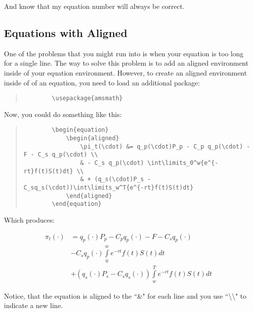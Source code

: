 And know that my equation number will always be correct.

\subsection{Equations with Aligned}
\label{eqwithalign}

One of the problems that you might run into is when your equation is too long for a single line.  The way to solve this problem is to add an aligned environment inside of your equation environment.  However, to create an aligned environment inside of of an equation, you need to load an additional package:

\begin{quote}
	\begin{verbatim}
		\usepackage{amsmath}
	\end{verbatim}
\end{quote}

Now, you could do something like this:

\begin{quote}
	\begin{verbatim}
		\begin{equation}
			\begin{aligned}
	  			\pi_t(\cdot) &= q_p(\cdot)P_p - C_p q_p(\cdot) - F - C_s q_p(\cdot) \\
	  			& - C_s q_p(\cdot) \int\limits_0^w{e^{-rt}f(t)S(t)dt} \\
	  			& + (q_s(\cdot)P_s - C_sq_s(\cdot))\int\limits_w^T{e^{-rt}f(t)S(t)dt}
	 		\end{aligned}
		\end{equation}
	\end{verbatim}
\end{quote}

Which produces:

\begin{equation}
	\begin{aligned}
		\pi_t(\cdot) &= q_p(\cdot)P_p - C_p q_p(\cdot) - F - C_s q_p(\cdot) \\
	  	& - C_s q_p(\cdot) \int\limits_0^w{e^{-rt}f(t)S(t)dt} \\
	  	& + (q_s(\cdot)P_s - C_sq_s(\cdot))\int\limits_w^T{e^{-rt}f(t)S(t)dt}
	 \end{aligned}
\end{equation}

Notice, that the equation is aligned to the ``\&" for each line and you use ``\textbackslash \textbackslash" to indicate a new line.


